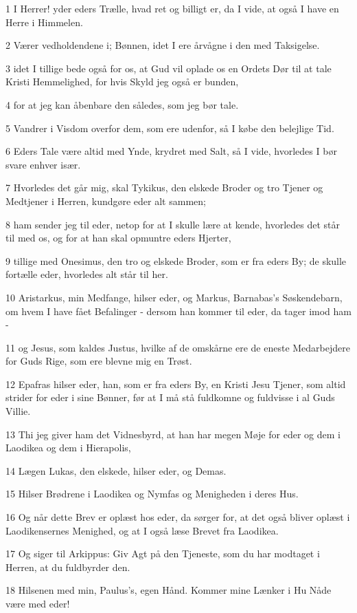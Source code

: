 \par 1 I Herrer! yder eders Trælle, hvad ret og billigt er, da I vide, at også I have en Herre i Himmelen.
\par 2 Værer vedholdendene i; Bønnen, idet I ere årvågne i den med Taksigelse.
\par 3 idet I tillige bede også for os, at Gud vil oplade os en Ordets Dør til at tale Kristi Hemmelighed, for hvis Skyld jeg også er bunden,
\par 4 for at jeg kan åbenbare den således, som jeg bør tale.
\par 5 Vandrer i Visdom overfor dem, som ere udenfor, så I købe den belejlige Tid.
\par 6 Eders Tale være altid med Ynde, krydret med Salt, så I vide, hvorledes I bør svare enhver især.
\par 7 Hvorledes det går mig, skal Tykikus, den elskede Broder og tro Tjener og Medtjener i Herren, kundgøre eder alt sammen;
\par 8 ham sender jeg til eder, netop for at I skulle lære at kende, hvorledes det står til med os, og for at han skal opmuntre eders Hjerter,
\par 9 tillige med Onesimus, den tro og elskede Broder, som er fra eders By; de skulle fortælle eder, hvorledes alt står til her.
\par 10 Aristarkus, min Medfange, hilser eder, og Markus, Barnabas's Søskendebarn, om hvem I have fået Befalinger - dersom han kommer til eder, da tager imod ham -
\par 11 og Jesus, som kaldes Justus, hvilke af de omskårne ere de eneste Medarbejdere for Guds Rige, som ere blevne mig en Trøst.
\par 12 Epafras hilser eder, han, som er fra eders By, en Kristi Jesu Tjener, som altid strider for eder i sine Bønner, før at I må stå fuldkomne og fuldvisse i al Guds Villie.
\par 13 Thi jeg giver ham det Vidnesbyrd, at han har megen Møje for eder og dem i Laodikea og dem i Hierapolis,
\par 14 Lægen Lukas, den elskede, hilser eder, og Demas.
\par 15 Hilser Brødrene i Laodikea og Nymfas og Menigheden i deres Hus.
\par 16 Og når dette Brev er oplæst hos eder, da sørger for, at det også bliver oplæst i Laodikensernes Menighed, og at I også læse Brevet fra Laodikea.
\par 17 Og siger til Arkippus: Giv Agt på den Tjeneste, som du har modtaget i Herren, at du fuldbyrder den.
\par 18 Hilsenen med min, Paulus's, egen Hånd. Kommer mine Lænker i Hu Nåde være med eder!


